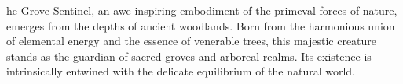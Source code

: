 \documentclass[letterpaper,openany,twoside,twocolumn]{book}
\begin{document}

\MonsterSheetGeometry

\mainmatter%

	

%

\entryfont \noindent {}he Grove Sentinel, an awe-inspiring embodiment of the primeval forces of nature, emerges from the depths of ancient woodlands. Born from the harmonious union of elemental energy and the essence of venerable trees, this majestic creature stands as the guardian of sacred groves and arboreal realms. Its existence is intrinsically entwined with the delicate equilibrium of the natural world.
\end{document}
